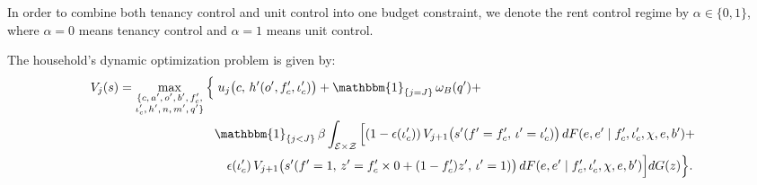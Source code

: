 \documentclass[parskip=full]{article}
\begin{document}
In order to combine both tenancy control and unit control into one budget constraint, we denote the rent control regime by $\alpha \in \{0,1\}$, where $\alpha=0$ means tenancy control and $\alpha=1$ means unit control. 

The household's dynamic optimization problem is given by:
\begin{equation}\label{eq:vf}
\begin{aligned}
V_{j}(s) 
= \max_{\substack{\{c,\, a',\, o',\, b',\, f'_c, \\ \iota'_c,\, h',\, n,\, m',\, q'\}}} \Big\{
& \; u_{j}\big( c,\, h'( o', f'_c, \iota'_c ) \big)
+ \mathbbm{1}_{\{ j = J \}}\, \omega_{B}(q')+ \\
& \mathbbm{1}_{\{ j < J \}}\, \beta 
\int_{\mathcal{E} \times \mathcal{Z}} \Big[
(1 - \epsilon(\iota'_c))\, V_{j+1}\big( s'( f' = f'_c,\, \iota' = \iota'_c ) \big) \, dF(e, e' \mid f'_c, \iota'_c, \chi, e, b') +\\ & \quad \epsilon(\iota'_c)\, V_{j+1}\big( s'( f' = 1,\, z' = f'_c \times 0 + (1 - f'_c) z',\, \iota' = 1 ) \big) \, dF(e, e' \mid f'_c, \iota'_c, \chi, e, b') \Big] dG(z)
\Big\}.
\end{aligned}
\end{equation}
\end{document}
